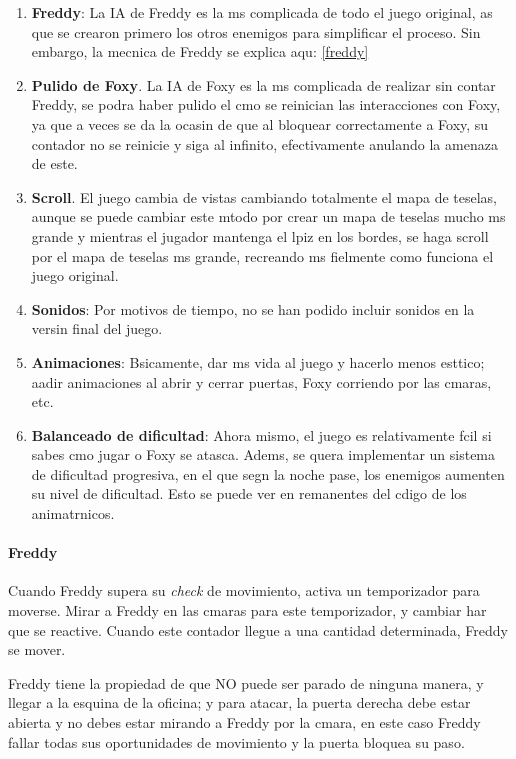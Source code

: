 \documentclass[12pt]{article}
\begin{document}
  \begin{enumerate}
    \item \textbf{Freddy}: La IA de Freddy es la ms complicada de todo el juego original, as que se crearon primero los otros enemigos para simplificar el proceso. Sin embargo, la mecnica de Freddy se explica aqu: \ref{freddy}
    \item \textbf{Pulido de Foxy}. La IA de Foxy es la ms complicada de realizar sin contar Freddy, se podra haber pulido el cmo se reinician las interacciones con Foxy, ya que a veces se da la ocasin de que al bloquear correctamente a Foxy, su contador no se reinicie y siga al infinito, efectivamente anulando la amenaza de este.
    \item \textbf{Scroll}. El juego cambia de vistas cambiando totalmente el mapa de teselas, aunque se puede cambiar este mtodo por crear un mapa de teselas mucho ms grande y mientras el jugador mantenga el lpiz en los bordes, se haga scroll por el mapa de teselas ms grande, recreando ms fielmente como funciona el juego original.
    \item \textbf{Sonidos}: Por motivos de tiempo, no se han podido incluir sonidos en la versin final del juego.
    \item \textbf{Animaciones}: Bsicamente, dar ms vida al juego y hacerlo menos esttico; aadir animaciones al abrir y cerrar puertas, Foxy corriendo por las cmaras, etc.
    \item \textbf{Balanceado de dificultad}: Ahora mismo, el juego es relativamente fcil si sabes cmo jugar o Foxy se atasca. Adems, se quera implementar un sistema de dificultad progresiva, en el que segn la noche pase, los enemigos aumenten su nivel de dificultad.
    Esto se puede ver en remanentes del cdigo de los animatrnicos.
  \end{enumerate}

  \paragraph{Freddy \label{freddy} \cite{fnaf_ai}}
  Cuando Freddy supera su \textit{check} de movimiento, activa un temporizador para moverse. Mirar a Freddy en las cmaras para este temporizador, y cambiar har que se reactive.
  Cuando este contador llegue a una cantidad determinada, Freddy se mover.

  Freddy tiene la propiedad de que NO puede ser parado de ninguna manera, y llegar a la esquina de la oficina; y para atacar, la puerta derecha debe estar abierta y no debes estar mirando a Freddy por la cmara, en este caso Freddy fallar todas sus oportunidades de movimiento y la puerta bloquea su paso.

\newpage

\printbibliography[title={Bibliografa y agradecimientos}]
\end{document}
